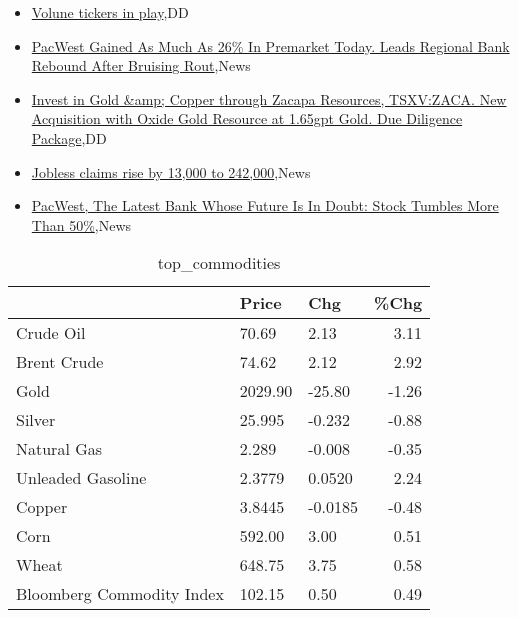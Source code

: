 \documentclass{article}%
\begin{document}
%
\begin{itemize}%
\item%
\href{https://reddit.com/r/wallstreetbets/comments/138jdx4/volune\_tickers\_in\_play/}{Volune tickers in play},DD%
\item%
\href{https://reddit.com/r/wallstreetbets/comments/138iyol/pacwest\_gained\_as\_much\_as\_26\_in\_premarket\_today/}{PacWest Gained As Much As 26\% In Premarket Today. Leads Regional Bank Rebound After Bruising Rout},News%
\item%
\href{https://reddit.com/r/Baystreetbets/comments/137s66g/invest\_in\_gold\_copper\_through\_zacapa\_resources/}{Invest in Gold \&amp; Copper through Zacapa Resources, TSXV:ZACA. New Acquisition with Oxide Gold Resource at 1.65gpt Gold. Due Diligence Package},DD%
\item%
\href{https://reddit.com/r/Economics/comments/138d57e/jobless\_claims\_rise\_by\_13000\_to\_242000/}{Jobless claims rise by 13,000 to 242,000},News%
\item%
\href{https://reddit.com/r/Economics/comments/1389no6/pacwest\_the\_latest\_bank\_whose\_future\_is\_in\_doubt/}{PacWest, The Latest Bank Whose Future Is In Doubt: Stock Tumbles More Than 50\%},News%
\end{itemize}%


\begin{table}[htbp]%
\caption{top\_commodities}%
\centering%
\begin{adjustbox}{width=1\textwidth}%
\begin{tabular}{lllr}
\toprule
                          &   Price &     Chg &  \%Chg \\
\midrule
               Crude Oil  &   70.69 &    2.13 &  3.11 \\
             Brent Crude  &   74.62 &    2.12 &  2.92 \\
                    Gold  & 2029.90 &  -25.80 & -1.26 \\
                  Silver  &  25.995 &  -0.232 & -0.88 \\
             Natural Gas  &   2.289 &  -0.008 & -0.35 \\
       Unleaded Gasoline  &  2.3779 &  0.0520 &  2.24 \\
                  Copper  &  3.8445 & -0.0185 & -0.48 \\
                    Corn  &  592.00 &    3.00 &  0.51 \\
                   Wheat  &  648.75 &    3.75 &  0.58 \\
Bloomberg Commodity Index &  102.15 &    0.50 &  0.49 \\
\bottomrule
\end{tabular}
%
\end{adjustbox}%
\end{table}
\end{document}
